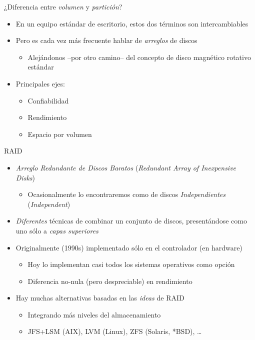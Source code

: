\documentclass[presentation]{beamer}
\begin{document}
\begin{frame}[label={sec:orga09de32}]{¿Diferencia entre \emph{volumen} y \emph{partición}?}
\begin{itemize}
\item En un equipo estándar de escritorio, estos dos términos son
intercambiables
\item Pero es cada vez más frecuente hablar de \emph{arreglos} de discos
\begin{itemize}
\item Alejándonos –por otro camino– del concepto de disco magnético
rotativo estándar
\end{itemize}
\item Principales ejes:
\begin{itemize}
\item Confiabilidad
\item Rendimiento
\item Espacio por volumen
\end{itemize}
\end{itemize}
\end{frame}

\begin{frame}[label={sec:org3b061a3}]{RAID}
\begin{itemize}
\item \emph{Arreglo Redundante de Discos Baratos} (\emph{Redundant Array of
Inexpensive Disks})
\begin{itemize}
\item Ocasionalmente lo encontraremos como de discos \emph{Independientes}
(\emph{Independent})
\end{itemize}
\item \emph{Diferentes} técnicas de combinar un conjunto de discos,
presentándose como uno sólo a \emph{capas superiores}
\item Originalmente (1990s) implementado sólo en el controlador (en
hardware)
\begin{itemize}
\item Hoy lo implementan casi todos los sistemas operativos como opción
\item Diferencia no-nula (pero despreciable) en rendimiento
\end{itemize}
\item Hay muchas alternativas basadas en las \emph{ideas} de RAID
\begin{itemize}
\item Integrando más niveles del almacenamiento
\item JFS+LSM (AIX), LVM (Linux), ZFS (Solaris, *BSD), \ldots{}
\end{itemize}
\end{itemize}
\end{frame}
\end{document}
